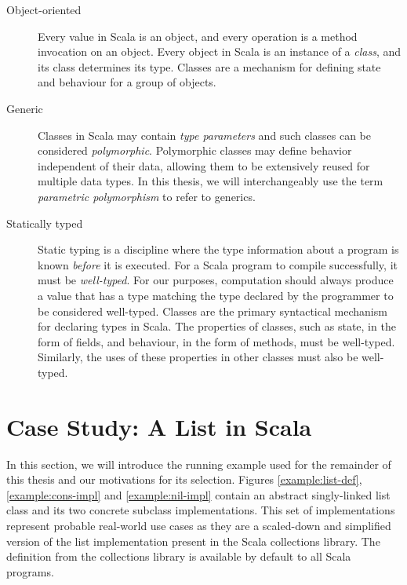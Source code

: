 \begin{description}
	\item[Object-oriented] 
	Every value in Scala is an object, and every operation is a method invocation on an object. 
	Every object in Scala is an instance of a \textit{class}, and its class determines its type.
	Classes\cite{simula:classes} are a mechanism for defining state and behaviour for a group of objects.	
	
	\item[Generic] 
	Classes in Scala may contain \textit{type parameters} and such classes can be considered \textit{polymorphic}\cite{strachey:fundamental-concepts}.
	Polymorphic classes may define behavior independent of their data, allowing them to be extensively reused for multiple data types.
	In this thesis, we will interchangeably use the term \textit{parametric polymorphism} to refer to generics.
	
	\item[Statically typed] 
	Static typing is a discipline where the type information about a program is known \textit{before} it is executed.
	For a Scala program to compile successfully, it must be \textit{well-typed}.
	For our purposes, computation should always produce a value that has a type matching the type declared by the programmer to be considered well-typed.
	Classes are the primary syntactical mechanism for declaring types in Scala. 
	The properties of classes, such as state, in the form of fields, and behaviour, in the form of methods, must be well-typed.
	Similarly, the uses of these properties in other classes must also be well-typed. 
\end{description}

\section{Case Study: A List in Scala}

In this section, we will introduce the running example used for the remainder of this thesis and our motivations for its selection.
Figures \ref{example:list-def}, \ref{example:cons-impl} and \ref{example:nil-impl} contain an abstract singly-linked list class and its two concrete subclass implementations. 
This set of  implementations represent probable real-world use cases as they are a scaled-down and simplified version of the list implementation present in the Scala collections library.
The  definition from the collections library is available by default to all Scala programs.

